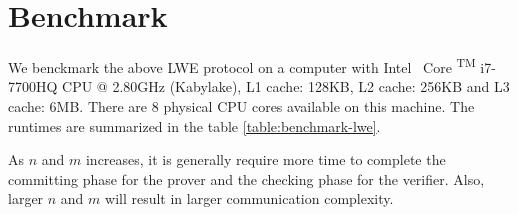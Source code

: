 \section{Benchmark}

We benckmark the above LWE protocol on a computer with
Intel \textregistered \, Core  \textsuperscript{TM} i7-7700HQ CPU @ 2.80GHz (Kabylake), L1 cache: 128KB, L2 cache: 256KB and L3 cache: 6MB. There are 8 physical CPU cores available on this machine. The runtimes are summarized in the table \ref{table:benchmark-lwe}.


As $n$ and $m$ increases, it is generally require more time to complete
the committing phase for the prover and the checking phase for the verifier. Also, larger $n$ and $m$ will result in larger communication complexity.

\begin{table}[h!]
\centering
\begin{tabular}{|c|m{4em}|m{4em}|m{4em}|m{7em}|}
\hline


\end{tabular}
\end{table}
